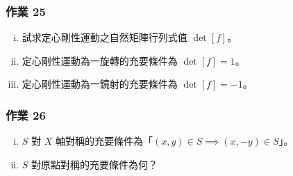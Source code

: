 \subsubsection*{作業 25}
\begin{enumerate}[(i)]
  \item 試求定心剛性運動之自然矩陣行列式值 $\det[f]$。
  \item 定心剛性運動為一旋轉的充要條件為 $\det[f] = 1$。
  \item 定心剛性運動為一鏡射的充要條件為 $\det[f] = -1$。
\end{enumerate}

\subsubsection*{作業 26}
\begin{enumerate}[(i)]
  \item $S$ 對 $X$ 軸對稱的充要條件為「$(x, y) \in S \implies (x, -y) \in S$」。
  \item $S$ 對原點對稱的充要條件為何？
\end{enumerate}

